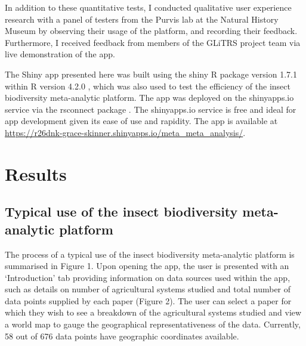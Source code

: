 \documentclass[11pt]{article}
\begin{document}
			\noindent In addition to these quantitative tests, I conducted qualitative user experience research with a panel of testers from the Purvis lab at the Natural History Museum by observing their usage of the platform, and recording their feedback. Furthermore, I received feedback from members of the GLiTRS project team via live demonstration of the app.
		
			\noindent The Shiny app presented here was built using the shiny R package version 1.7.1 \parencite{chang2022shiny} within R version 4.2.0 \parencite{team2013r}, which was also used to test the efficiency of the insect biodiversity meta-analytic platform. The app was deployed on the shinyapps.io service via the rsconnect package \parencite{atkins2019rsconnect}. The shinyapps.io service is free and ideal for app development given its ease of use and rapidity. The app is available at \url{https://r26dnk-grace-skinner.shinyapps.io/meta_meta_analysis/}. 
	
	\clearpage 
	
	\section{Results}
		\subsection{Typical use of the insect biodiversity meta-analytic platform} 
			The process of a typical use of the insect biodiversity meta-analytic platform is summarised in Figure 1. Upon opening the app, the user is presented with an ‘Introduction’ tab providing information on data sources used within the app, such as details on number of agricultural systems studied and total number of data points supplied by each paper (Figure 2). The user can select a paper for which they wish to see a breakdown of the agricultural systems studied and view a world map to gauge the geographical representativeness of the data. Currently, 58 out of 676 data points have geographic coordinates available.
			
\end{document}
